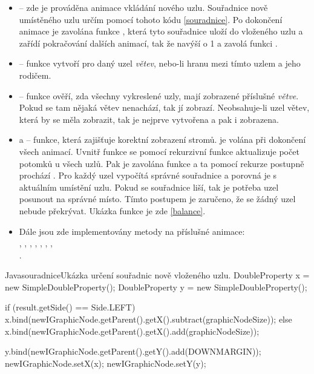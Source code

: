 \documentclass[
  biblatex=false,
  font=serif,
  glossaries=false,
  tables=false,
  theorems=false,
  index
]{kidiplom}
\begin{document}
\begin{itemize}
\item {} -- zde je prováděna animace vkládání nového uzlu. Souřadnice nově umístěného uzlu určím pomocí tohoto kódu \ref{souradnice}. Po dokončení animace je zavolána funkce , která tyto souřadnice uloží do vloženého uzlu a zařídí pokračování dalších animací, tak že navýší  o 1 a zavolá funkci .

\item {} -- funkce vytvoří pro daný uzel \textit{větev}, nebo-li hranu mezi tímto uzlem a jeho rodičem.

\item {} -- funkce ověří, zda všechny vykreslené uzly, mají zobrazené příslušné \textit{větve}. Pokud se tam nějaká větev nenachází, tak jí zobrazí. Neobsahuje-li uzel větev, která by se měla zobrazit, tak je nejprve vytvořena a pak i zobrazena.

\item {} a  -- funkce, která zajišťuje korektní zobrazení stromů.  je volána při dokončení všech animací. Uvnitř funkce se pomocí rekurzivní funkce  aktualizuje počet potomků u všech uzlů. Pak je zavolána funkce  a ta pomocí rekurze postupně prochází . Pro každý uzel vypočítá správné souřadnice a porovná je s aktuálním umístění uzlu. Pokud se souřadnice liší, tak je potřeba uzel posunout na správné místo. Tímto postupem je zaručeno, že se žádný uzel nebude překrývat. Ukázka funkce je zde \ref{balance}.
\item Dále jsou zde implementovány metody na příslušné animace: \\, , , , , , ,\\.
\end{itemize}

\begin{kicode}{Java}{souradnice}{Ukázka určení souřadnic nově vloženého uzlu.}
DoubleProperty x = new SimpleDoubleProperty();
DoubleProperty y = new SimpleDoubleProperty();

if (result.getSide() == Side.LEFT) {
	x.bind(newIGraphicNode.getParent().getX().subtract(graphicNodeSize));	
} else {
	x.bind(newIGraphicNode.getParent().getX().add(graphicNodeSize));	
}
	
y.bind(newIGraphicNode.getParent().getY().add(DOWNMARGIN));	
newIGraphicNode.setX(x);
newIGraphicNode.setY(y);
\end{kicode}
\end{document}
